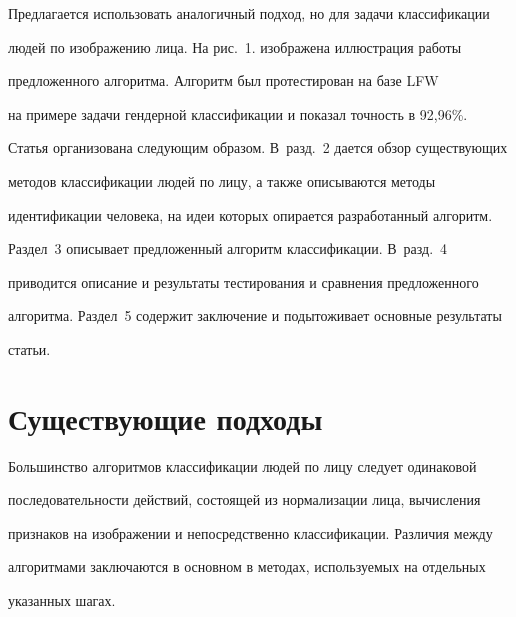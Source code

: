 Предлагается использовать аналогичный подход, но для задачи классификации 


людей по изображению лица. На рис.~1. изображена иллюстрация работы 


предложенного алгоритма. Алгоритм был протестирован на базе LFW~\cite{8-k} 


на примере задачи гендерной классификации и показал точность в 92,96\%.





Статья организована следующим образом. В~разд.~2 дается обзор существующих 


методов классификации людей по лицу, а также описываются методы 


идентификации человека, на идеи которых опирается разработанный алгоритм. 


Раздел~3 описывает предложенный алгоритм классификации. В~разд.~4 


приводится описание и результаты тестирования и сравнения предложенного 


алгоритма. Раздел~5 содержит заключение и подытоживает основные результаты 


статьи. 





\vspace*{-6pt}





\section{Существующие подходы}





\vspace*{-2pt}





Большинство алгоритмов классификации людей по лицу следует одинаковой 


последовательности действий, состоящей из нормализации лица, вычисления 


признаков на изображении и непосредственно классификации. Различия между 


алгоритмами заключаются в основном в методах, используемых на отдельных 


указанных шагах. 






